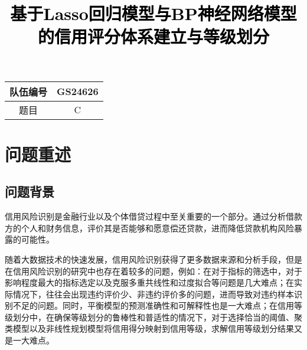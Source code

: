 \documentclass[12pt,a4paper]{nmmcm}
\title{\textcolor{black}{基于Lasso回归模型与BP神经网络模型的信用评分体系建立与等级划分}}
\date{}
\begin{document}
\begin{center}
    \begin{tabular}{|c|c|}
    \hline
    队伍编号 & GS24626 \\
    \hline
    题目 & C \\
    \hline
    \end{tabular}
\end{center}

\begin{abstract}




\thispagestyle{empty}
\begin{center}
    \Large 
\end{center}
\end{abstract}

\maketitle
\renewcommand{\contentsname}{\centerline{\sanhao\bfseries\HEI 目\quad 录}}
\tableofcontents

\newpage
\setcounter{page}{1}

\section{问题重述}
\subsection{问题背景}
信用风险识别是金融行业以及个体借贷过程中至关重要的一个部分。通过分析借款方的个人和财务信息，评价其是否能够和愿意偿还贷款，进而降低贷款机构风险暴露的可能性。

随着大数据技术的快速发展，信用风险识别获得了更多数据来源和分析手段，但是在信用风险识别的研究中也存在着较多的问题，例如：在对于指标的筛选中，对于影响程度最大的指标选定以及克服多重共线性和过度拟合等问题是几大难点；在实际情况下，往往会出现违约评价少、非违约评价多的问题，进而导致对违约样本识别不足的问题。同时，平衡模型的预测准确性和可解释性也是一大难点；在信用等级划分中，在确保等级划分的鲁棒性和普适性的情况下，对于选择恰当的阈值、聚类模型以及非线性规划模型将信用得分映射到信用等级，求解信用等级划分结果又是一大难点。
\end{document}
